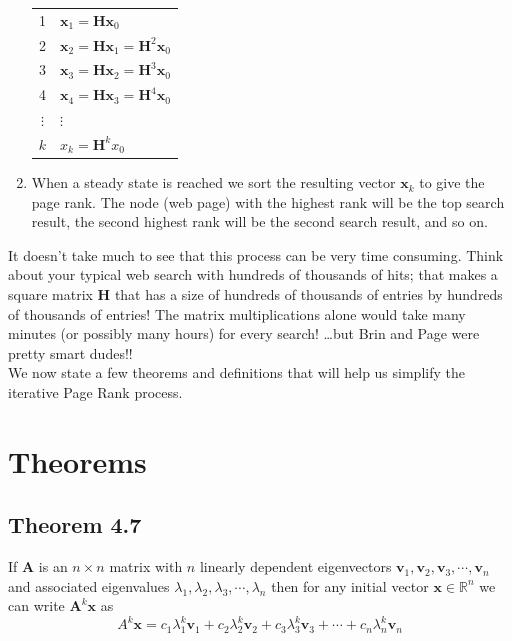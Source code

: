\documentclass{article}
\begin{document}
\begin{enumerate}
\begin{table}[H]
\begin{tabular}{|c|>{\raggedright\arraybackslash}p{6cm}|}
                1 & $\boldsymbol{x}_1 = \boldsymbol{H} \boldsymbol{x}_0$ \\
                2 & $\boldsymbol{x}_2 = \boldsymbol{H} \boldsymbol{x}_1 = \boldsymbol{H}^2 \boldsymbol{x}_0$ \\
                3 & $\boldsymbol{x}_3 = \boldsymbol{H} \boldsymbol{x}_2 = \boldsymbol{H}^3 \boldsymbol{x}_0$ \\
                4 & $\boldsymbol{x}_4 = \boldsymbol{H} \boldsymbol{x}_3 = \boldsymbol{H}^4 \boldsymbol{x}_0$ \\
                $\vdots$ & $\vdots$ \\
                $k$ & $x_k = \boldsymbol{H}^k x_0$ \\
                \hline
                \end{tabular}
            \end{table}
    \item When a steady state is reached we sort the resulting vector $\boldsymbol{x}_k$ to give the page rank. The node (web page) with the highest rank will be the top search result, the second highest rank will be the second search result, and so on.
            
\end{enumerate}

\noindent It doesn’t take much to see that this process can be very time consuming. Think about your typical web search with hundreds of thousands of hits; that makes a square matrix $\boldsymbol{H}$ 
that has a size of hundreds of thousands of entries by hundreds of thousands of entries! The matrix multiplications alone would take many minutes (or possibly many hours) for every search! …but Brin and Page were pretty smart dudes!!\\

\noindent We now state a few theorems and definitions that will help us simplify the iterative Page Rank process.


\section{Theorems}

\subsection*{Theorem 4.7}

If $\boldsymbol{A}$ is an $n\times n$ matrix with $n$ linearly dependent eigenvectors $\boldsymbol{v}_1,\boldsymbol{v}_2, \boldsymbol{v}_3,\cdots,\boldsymbol{v}_n$
and associated eigenvalues $\lambda_1,\lambda_2,\lambda_3,\cdots,\lambda_n$ then for any initial vector $\boldsymbol{x} \in \mathbb{R}^n$
we can write $\boldsymbol{A}^k\boldsymbol{x}$ as
$$
A^k\boldsymbol{x}=c_1\lambda_1^k\boldsymbol{v}_1+c_2\lambda_2^k\boldsymbol{v}_2+c_3\lambda_3^k\boldsymbol{v}_3+\cdots+c_n\lambda_n^k\boldsymbol{v}_n
$$
\end{document}
